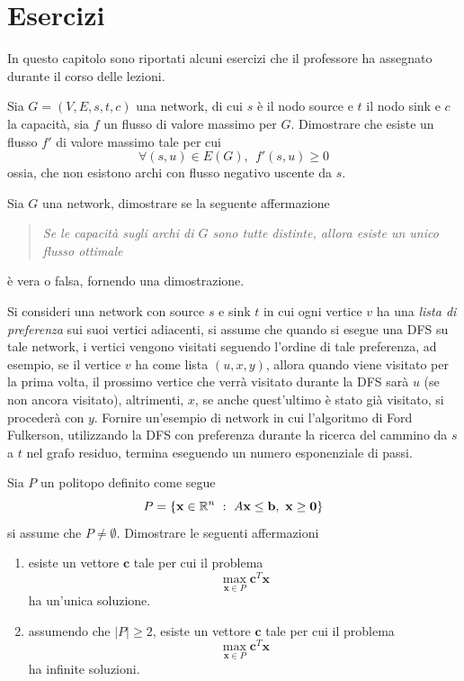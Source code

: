 \documentclass[10pt, letterpaper]{report}
\newcommand{\bb}{{\mathbf{b}}}
\newcommand{\bc}{{\mathbf{c}}}
\newcommand{\x}{{\mathbf{x}}}
\begin{document}
\chapter*{Esercizi}
In questo capitolo sono riportati alcuni esercizi che il professore ha assegnato durante il corso delle lezioni.
\begin{esercizio}
\end{esercizio}
Sia $G=(V,E,s,t,c)$ una network, di cui $s$ è il nodo source e $t$ il nodo sink e $c$ la capacità, sia $f$ un flusso di valore massimo per $G$. Dimostrare che esiste un flusso $f'$ di valore massimo tale per cui 
$$ \forall (s,u)\in E(G), \ \ f'(s,u)\ge 0$$
ossia, che non esistono archi con flusso negativo uscente da $s$.
\begin{esercizio}
\end{esercizio}
Sia $G$ una network, dimostrare se la seguente affermazione\begin{quote}
    \textit{Se le capacità sugli archi di $G$ sono tutte distinte, allora esiste un unico flusso ottimale}
\end{quote}
è vera o falsa, fornendo una dimostrazione.
\begin{esercizio}
\end{esercizio}
Si consideri una network con source $s$ e sink $t$ in cui ogni vertice $v$ ha una \textit{lista di preferenza} sui suoi vertici adiacenti, si assume che quando si esegue una DFS su tale network, i vertici vengono visitati seguendo l'ordine di tale preferenza, ad esempio, se il vertice $v$ ha come lista $(u,x,y)$, allora quando viene visitato per la prima volta, il prossimo vertice che verrà visitato durante la DFS sarà $u$ (se non ancora visitato), altrimenti, $x$, se anche quest'ultimo è stato già visitato, si procederà con $y$. Fornire un'esempio di network in cui l'algoritmo di Ford Fulkerson, utilizzando la DFS con preferenza durante la ricerca del cammino da $s$ a $t$ nel grafo residuo, termina eseguendo un numero esponenziale di passi.
\begin{esercizio}
\end{esercizio}
Sia $P$ un politopo definito come segue 
$$P=\{\x\in\R^n \ : \ A\x\le\bb, \ \x\ge \mathbf 0\} $$
si assume che $P\ne \emptyset$. Dimostrare le seguenti affermazioni\begin{enumerate}
    \item esiste un vettore $\bc$ tale per cui il problema $$\max_{\x\in P}\bc^T\x$$ ha un'unica soluzione.
    \item assumendo che $|P|\ge 2$, esiste un vettore $\bc$ tale per cui il  problema $$\max_{\x\in P}\bc^T\x$$
    ha infinite soluzioni.
\end{enumerate}
\end{document}
